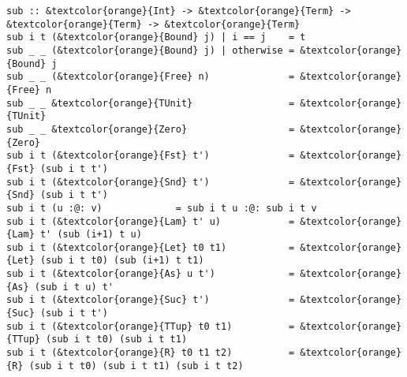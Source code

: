 \documentclass[12pt, a4paper]{article}
\begin{document}
\begin{Verbatim}[commandchars=\&\{\}]
sub :: &textcolor{orange}{Int} -> &textcolor{orange}{Term} -> &textcolor{orange}{Term} -> &textcolor{orange}{Term}
sub i t (&textcolor{orange}{Bound} j) | i == j    = t
sub _ _ (&textcolor{orange}{Bound} j) | otherwise = &textcolor{orange}{Bound} j
sub _ _ (&textcolor{orange}{Free} n)              = &textcolor{orange}{Free} n
sub _ _ &textcolor{orange}{TUnit}                 = &textcolor{orange}{TUnit}
sub _ _ &textcolor{orange}{Zero}                  = &textcolor{orange}{Zero}
sub i t (&textcolor{orange}{Fst} t')              = &textcolor{orange}{Fst} (sub i t t')
sub i t (&textcolor{orange}{Snd} t')              = &textcolor{orange}{Snd} (sub i t t')
sub i t (u :@: v)             = sub i t u :@: sub i t v
sub i t (&textcolor{orange}{Lam} t' u)            = &textcolor{orange}{Lam} t' (sub (i+1) t u)
sub i t (&textcolor{orange}{Let} t0 t1)           = &textcolor{orange}{Let} (sub i t t0) (sub (i+1) t t1)
sub i t (&textcolor{orange}{As} u t')             = &textcolor{orange}{As} (sub i t u) t'
sub i t (&textcolor{orange}{Suc} t')              = &textcolor{orange}{Suc} (sub i t t')
sub i t (&textcolor{orange}{TTup} t0 t1)          = &textcolor{orange}{TTup} (sub i t t0) (sub i t t1)
sub i t (&textcolor{orange}{R} t0 t1 t2)          = &textcolor{orange}{R} (sub i t t0) (sub i t t1) (sub i t t2)


\end{Verbatim}
\end{document}
